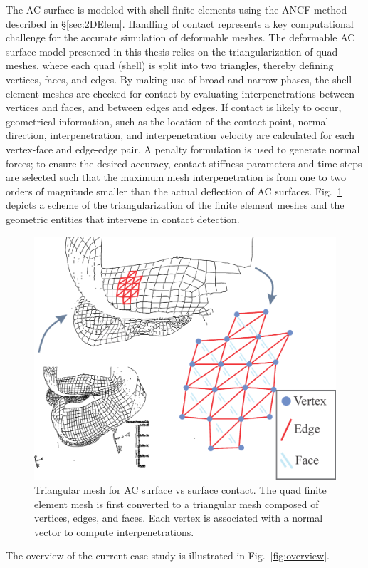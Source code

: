 The AC surface is modeled with shell finite elements using the ANCF method described in \S\ref{sec:2DElem}. Handling of contact represents a key computational challenge for the accurate simulation of deformable meshes. The deformable AC surface model presented in this thesis relies on the triangularization of quad meshes, where each quad (shell) is split into two triangles, thereby defining vertices, faces, and edges. By making use of broad and narrow phases, the shell element meshes are checked for contact by evaluating interpenetrations between vertices and faces, and between edges and edges. If contact is likely to occur, geometrical information, such as the location of the contact point, normal direction, interpenetration, and interpenetration velocity are calculated for each vertex-face and edge-edge pair. A penalty formulation is used to generate normal forces; to ensure the desired accuracy, contact stiffness parameters and time steps are selected such that the maximum mesh interpenetration is from one to two orders of magnitude smaller than the actual deflection of AC surfaces. Fig.~\ref{fig:contact} depicts a scheme of the triangularization of the finite element meshes and the geometric entities that intervene in contact detection.
\begin{figure}[H]
	\begin{center}
		\includegraphics[width=0.50\columnwidth]{images/AC/contact.png}
		\caption{Triangular mesh for AC surface vs surface contact. The quad finite element mesh is first converted to a triangular mesh composed of vertices, edges, and faces. Each vertex is associated with a normal vector to compute interpenetrations. }\label{fig:contact}
	\end{center}
\end{figure}
The overview of the current case study is illustrated in Fig.~\ref{fig:overview}.
